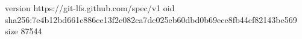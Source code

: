 version https://git-lfs.github.com/spec/v1
oid sha256:7e4b12bd661c886ce13f2c082ca7dc025eb60dbd0b69ece8fb44cf82143be569
size 87544
